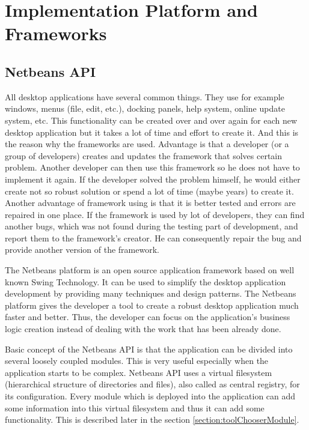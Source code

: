 \chapter{Implementation Platform and Frameworks}

\section{Netbeans API}
\label{section:netbeansAPI}

All desktop applications have several common things. They use for example windows, menus (file, edit, etc.), docking panels, help system, online update system, etc. This functionality can be created over and over again for each new desktop application but it takes a lot of time and effort to create it. And this is the reason why the frameworks are used. Advantage is that a developer (or a group of developers) creates and updates the framework that solves certain problem. Another developer can then use this framework so he does not have to implement it again. If the developer solved the problem himself, he would either create not so robust solution or spend a lot of time (maybe years) to create it. Another advantage of framework using is that it is better tested and errors are repaired in one place. If the framework is used by lot of developers, they can find another bugs, which was not found during the testing part of development, and report them to the framework's creator. He can consequently repair the bug and provide another version of the framework.

The Netbeans platform is an open source application framework based on well known Swing Technology. It can be used to simplify the desktop application development by providing many techniques and design patterns. The Netbeans platform gives the developer a tool to create a robust desktop application much faster and better. Thus, the developer can focus on the application's business logic creation instead of dealing with the work that has been already done.

Basic concept of the Netbeans API is that the application can be divided into several loosely coupled modules. This is very useful especially when the application starts to be complex. Netbeans API uses a virtual filesystem (hierarchical structure of directories and files), also called as central registry, for its configuration. Every module which is deployed into the application can add some information into this virtual filesystem and thus it can add some functionality. This is described later in the section \ref{section:toolChooserModule}.

